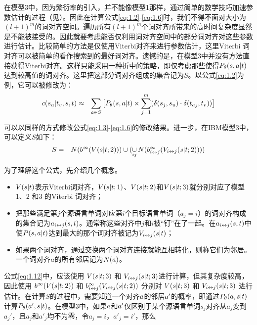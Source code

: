 \begin{appendices}
\parinterval 在模型3中，因为繁衍率的引入，并不能像模型1那样，通过简单的数学技巧加速参数估计的过程（见{\chapterfive}）。因此在计算公式\eqref{eq:1.2}-\eqref{eq:1.6}时，我们不得不面对大小为$(l+1)^m$的词对齐空间。遍历所有$(l+1)^m$个词对齐所带来的高时间复杂度显然是不能被接受的。因此就要考虑能否仅利用词对齐空间中的部分词对齐对这些参数进行估计。比较简单的方法是仅使用Viterbi对齐来进行参数估计，这里Viterbi 词对齐可以被简单的看作搜索到的最好词对齐。遗憾的是，在模型3中并没有方法直接获得Viterbi对齐。这样只能采用一种折中的策略，即仅考虑那些使得${P}_{\theta}({s},{a}|{t})$ 达到较高值的词对齐。这里把这部分词对齐组成的集合记为$S$。以公式\eqref{eq:1.2}为例，它可以被修改为：
\begin{eqnarray}
c(s_u|t_v,{s},{t}) &\approx & \sum_{{a} \in S}\big[{P}_{\theta}({s},{a}|{t}) \times \sum_{j=1}^{m}(\delta(s_j,s_u) \cdot \delta(t_{a_{j}},t_v)) \big]
\label{eq:1.11}
\end{eqnarray}

\parinterval 可以以同样的方式修改公式\eqref{eq:1.3}-\eqref{eq:1.6}的修改结果。进一步，在IBM模型3中，可以定义$S$如下：
\begin{eqnarray}
S &=& N(b^{\infty}(V({s}|{t};2))) \cup (\mathop{\cup}\limits_{ij} N(b_{i \leftrightarrow j}^{\infty}(V_{i \leftrightarrow j}({s}|{t};2))))
\label{eq:1.12}
\end{eqnarray}

\parinterval 为了理解这个公式，先介绍几个概念。
\begin{itemize}
\item $V({s}|{t})$表示Viterbi词对齐，$V({s}|{t};1)$、$V({s}|{t};2)$和$V({s}|{t};3)$就分别对应了模型1、2 和3 的Viterbi 词对齐；
\item 把那些满足第$j$个源语言单词对应第$i$个目标语言单词（$a_j=i$）的词对齐构成的集合记为${a}_{i \leftrightarrow j}({s},{t})$。通常称这些对齐中$j$和$i$被``钉''在了一起。在${a}_{i \leftrightarrow j}({s},{t})$中使${P}({s},{a}| {t})$达到最大的那个词对齐被记为$V_{i \leftrightarrow j}({s}|{t})$；
\item 如果两个词对齐，通过交换两个词对齐连接就能互相转化，则称它们为邻居。一个词对齐${a}$的所有邻居记为$N({a})$。
\end{itemize}

\vspace{0.5em}
\parinterval 公式\eqref{eq:1.12}中，应该使用 $V({s}|{t};3)$ 和 $V_{i \leftrightarrow j}({s}|{t};3)$进行计算，但其复杂度较高，因此使用 $b^{\infty}(V({s}|{t};2))$ 和 $b_{i \leftrightarrow j}^{\infty}(V_{i \leftrightarrow j}({s}|{t};2))$ 分别对 $V({s}|{t};3)$ 和 $V_{i \leftrightarrow j}({s}|{t};3)$ 进行估计。在计算$S$的过程中，需要知道一个对齐${a}$的邻居${a}'$的概率，即通过${P}_{\theta}({a},{s}|{t})$计算${P}_{\theta}({a}',{s}|{t})$。在模型3中，如果${a}$和${a}'$仅区别于某个源语言单词$s_j$对齐从$a_j$变到$a_{j}'$，且$a_j$和$a'_j$均不为零，令$a_j=i$，$a'_{j}=i'$，那么


\end{appendices}
